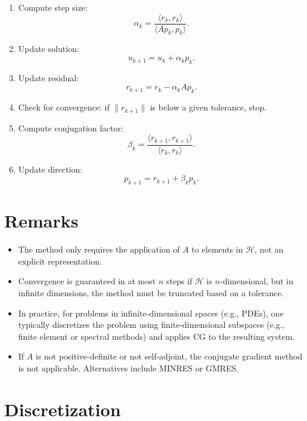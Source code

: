 \documentclass[12pt]{article}
\begin{document}
\begin{enumerate}[label=(\arabic*)]
    \item Compute step size:
    \[
    \alpha_k = \frac{\langle r_k, r_k \rangle}{\langle A p_k, p_k \rangle}.
    \]
    
    \item Update solution:
    \[
    u_{k+1} = u_k + \alpha_k p_k.
    \]
    
    \item Update residual:
    \[
    r_{k+1} = r_k - \alpha_k A p_k.
    \]
    
    \item Check for convergence: if \( \|r_{k+1}\| \) is below a given tolerance, stop.
    
    \item Compute conjugation factor:
    \[
    \beta_k = \frac{\langle r_{k+1}, r_{k+1} \rangle}{\langle r_k, r_k \rangle}.
    \]
    
    \item Update direction:
    \[
    p_{k+1} = r_{k+1} + \beta_k p_k.
    \]
\end{enumerate}

\section{Remarks}

\begin{itemize}
    \item The method only requires the application of \( A \) to elements in \( \mathcal{H} \), not an explicit representation.
    
    \item Convergence is guaranteed in at most \( n \) steps if \( \mathcal{H} \) is \( n \)-dimensional, but in infinite dimensions, the method must be truncated based on a tolerance.
    
    \item In practice, for problems in infinite-dimensional spaces (e.g., PDEs), one typically discretizes the problem using finite-dimensional subspaces (e.g., finite element or spectral methods) and applies CG to the resulting system.
    
    \item If \( A \) is not positive-definite or not self-adjoint, the conjugate gradient method is not applicable. Alternatives include MINRES or GMRES.
\end{itemize}

\section{Discretization}
\end{document}
